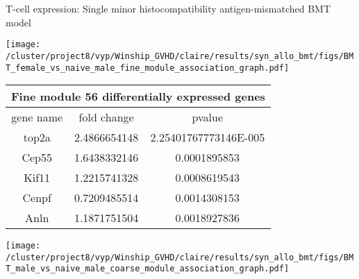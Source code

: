 \documentclass[final,hyperref={pdfpagelabels=false}]{beamer}
\begin{document}
\begin{frame}{}
\begin{columns}[t]
\begin{column}{.25\linewidth}
\begin{block}{T-cell expression: Single minor histocompatibility antigen-mismatched BMT model}
	  \begin{minipage}{0.45\textwidth}
            \texttt{[image: /cluster/project8/vyp/Winship\_GVHD/claire/results/syn\_allo\_bmt/figs/BMT\_female\_vs\_naive\_male\_fine\_module\_association\_graph.pdf]}
          \end{minipage}
{\scriptsize    \begin{tabular}{ |c|c|c| } 
	    \hline
	    \multicolumn{3}{|c|}{Fine module 56 differentially expressed genes} \\
	      \hline
	      gene name & fold change & pvalue \\
	      \hline
	    top2a &	2.4866654148 &	2.25401767773146E-005 \\ %
Cep55 &	1.6438332146 &	0.0001895853 \\ %
Kif11 &	1.2215741328 &	0.0008619543 \\ %
Cenpf &	0.7209485514 &	0.0014308153 \\
Anln  &	1.1871751504 &	0.0018927836 \\
              
	      \hline
	    \end{tabular} }
          \begin{minipage}{0.45\textwidth}
            \texttt{[image: /cluster/project8/vyp/Winship\_GVHD/claire/results/syn\_allo\_bmt/figs/BMT\_male\_vs\_naive\_male\_coarse\_module\_association\_graph.pdf]}
          \end{minipage}


\end{block}
\end{column}
\end{columns}
\end{frame}
\end{document}
